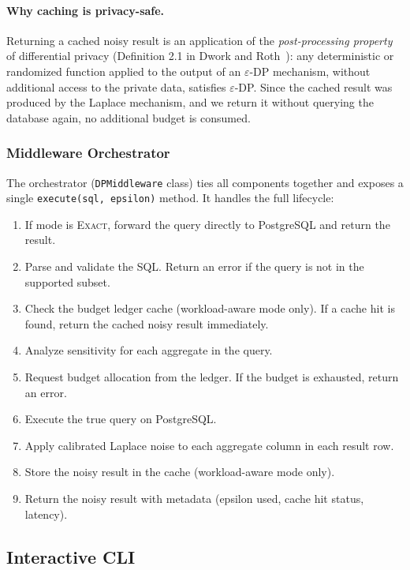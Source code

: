 \documentclass[sigconf,nonacm]{acmart}
\begin{document}
\paragraph{Why caching is privacy-safe.} Returning a cached noisy result is an application of the \emph{post-processing property} of differential privacy (Definition 2.1 in Dwork and Roth~\cite{dwork2014algorithmic}): any deterministic or randomized function applied to the output of an $\varepsilon$-DP mechanism, without additional access to the private data, satisfies $\varepsilon$-DP. Since the cached result was produced by the Laplace mechanism, and we return it without querying the database again, no additional budget is consumed.

\subsubsection{Middleware Orchestrator}

The orchestrator (\texttt{DPMiddleware} class) ties all components together and exposes a single \texttt{execute(sql, epsilon)} method. It handles the full lifecycle:
\begin{enumerate}
    \item If mode is \textsc{Exact}, forward the query directly to PostgreSQL and return the result.
    \item Parse and validate the SQL. Return an error if the query is not in the supported subset.
    \item Check the budget ledger cache (workload-aware mode only). If a cache hit is found, return the cached noisy result immediately.
    \item Analyze sensitivity for each aggregate in the query.
    \item Request budget allocation from the ledger. If the budget is exhausted, return an error.
    \item Execute the true query on PostgreSQL.
    \item Apply calibrated Laplace noise to each aggregate column in each result row.
    \item Store the noisy result in the cache (workload-aware mode only).
    \item Return the noisy result with metadata (epsilon used, cache hit status, latency).
\end{enumerate}

\subsection{Interactive CLI}
\end{document}
